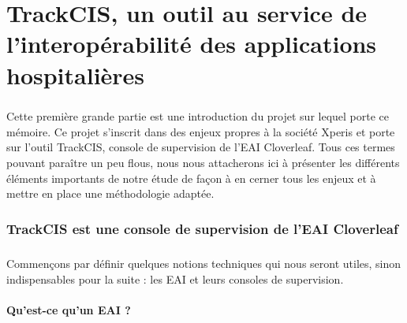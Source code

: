 \chapter{TrackCIS, un outil au service de l'interopérabilité des applications
hospitalières}
	\paragraph{}
	Cette première grande partie est une introduction du projet sur lequel porte ce
	mémoire. Ce projet s'inscrit dans des enjeux propres à la société Xperis et
	porte sur l'outil TrackCIS, console de supervision de l'EAI Cloverleaf. Tous
	ces termes pouvant paraître un peu flous, nous nous attacherons ici à présenter
	les différents éléments importants de notre étude de façon à en cerner tous
	les enjeux et à mettre en place une méthodologie adaptée.

	\subsection{TrackCIS est une console de supervision de l'EAI Cloverleaf}
		\paragraph{}
		Commençons par définir quelques notions techniques qui nous seront utiles,
		sinon indispensables pour la suite : les EAI et leurs consoles de supervision.
		
		\subsubsection{Qu'est-ce qu'un EAI ?}
